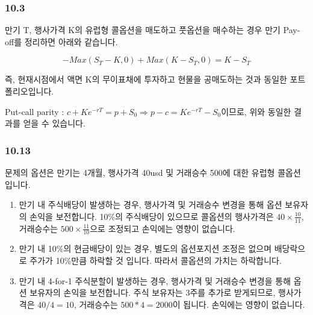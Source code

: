 \documentclass[
  letterpaper,
  DIV=11,
  numbers=noendperiod]{scrreprt}
\begin{document}
\subsubsection*{\texorpdfstring{\textbf{10.3}}{10.3}}\label{section}

만기 T, 행사가격 K의 유럽형 콜옵션을 매도하고 풋옵션을 매수하는 경우
만기 Pay-off를 정리하면 아래와 같습니다.

\[-Max(S_T-K,0)+Max(K-S_T,0)=K-S_T\]

즉, 현재시점에서 액면 K의 무이표채에 투자하고 현물을 공매도하는 것과
동일한 포트폴리오입니다.

\begin{tcolorbox}[enhanced jigsaw, toprule=.15mm, breakable, left=2mm, leftrule=.75mm, opacitybacktitle=0.6, coltitle=black, rightrule=.15mm, colback=white, titlerule=0mm, bottomtitle=1mm, colframe=quarto-callout-tip-color-frame, title=\textcolor{quarto-callout-tip-color}{\faLightbulb}\hspace{0.5em}{Tip}, toptitle=1mm, arc=.35mm, colbacktitle=quarto-callout-tip-color!10!white, opacityback=0, bottomrule=.15mm]

Put-call parity :
\(c+Ke^{-rT}=p+S_0\Rightarrow p-c=Ke^{-rT}-S_0\)이므로, 위와 동일한
결과를 얻을 수 있습니다.

\end{tcolorbox}

\subsubsection*{\texorpdfstring{\textbf{10.13}}{10.13}}\label{section-1}

문제의 옵션은 만기는 4개월, 행사가격 40usd 및 거래승수 500에 대한 유럽형
콜옵션입니다.

\begin{enumerate}
\def\labelenumi{(\alph{enumi})}
\item
  만기 내 주식배당이 발생하는 경우, 행사가격 및 거래승수 변경을 통해
  옵션 보유자의 손익을 보전합니다. 10\%의 주식배당이 있으므로 콜옵션의
  행사가격은 \(40\times\frac{10}{11}\), 거래승수는
  \(500\times\frac{11}{10}\)으로 조정되고 손익에는 영향이 없습니다.
\item
  만기 내 10\%의 현금배당이 있는 경우, 별도의 옵션포지션 조정은 없으며
  배당락으로 주가가 10\%만큼 하락할 것 입니다. 따라서 콜옵션의 가치는
  하락합니다.
\item
  만기 내 4-for-1 주식분할이 발생하는 경우, 행사가격 및 거래승수 변경을
  통해 옵션 보유자의 손익을 보전합니다. 주식 보유자는 3주를 추가로
  받게되므로, 행사가격은 \(40/4=10\), 거래승수는 \(500*4=2000\)이
  됩니다. 손익에는 영향이 없습니다.
\end{enumerate}
\end{document}
